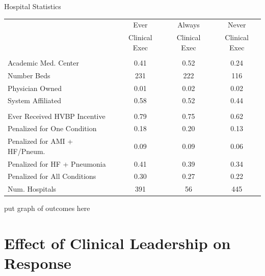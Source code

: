 \documentclass[notes,11pt, aspectratio=169]{beamer}
\begin{document}
\begin{frame}{Hospital Statistics}
\vspace{-2mm}
    \begin{table}[ht!]
    \centering
    \begin{tabular}[t]{lccc}
     & Ever & Always & Never\\
      & Clinical Exec & Clinical Exec & Clinical Exec\\
    \midrule
    \addlinespace[0.3em]
    \multicolumn{4}{l}{\textbf{Hospital Characteristics}}\\
    \hspace{1em}Academic Med. Center & 0.41 & 0.52 & 0.24\\
    \hspace{1em}Number Beds & 231 & 222 & 116\\
    \hspace{1em}Physician Owned & 0.01 & 0.02 & 0.02\\
    \hspace{1em}System Affiliated & 0.58 & 0.52 & 0.44\\
    \addlinespace[0.3em]
    \multicolumn{4}{l}{\textbf{Penalty/Payment Variables}}\\
    \hspace{1em}Ever Received HVBP Incentive & 0.79 & 0.75 & 0.62\\
    \hspace{1em}Penalized for One Condition & 0.18 & 0.20 & 0.13\\
    \hspace{1em}Penalized for AMI + HF/Pneum. & 0.09 & 0.09 & 0.06\\
    \hspace{1em}Penalized for HF + Pneumonia & 0.41 & 0.39 & 0.34\\
    \hspace{1em}Penalized for All Conditions & 0.30 & 0.27 & 0.22\\
    Num. Hospitals & 391 & 56 & 445\\
    \bottomrule
    \end{tabular}
    \end{table}
\end{frame}

\begin{frame}{}
    put graph of outcomes here
\end{frame}


\section{Effect of Clinical Leadership on Response}
\end{document}
